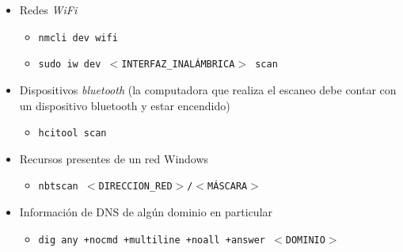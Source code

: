 \begin{itemize}
    \item Redes \emph{WiFi} 
    \begin{itemize}
        \item \texttt{nmcli dev wifi} 
        \item \texttt{sudo iw dev $<$INTERFAZ\_INALÁMBRICA$>$ scan} 
    \end{itemize}
    \item Dispositivos \emph{bluetooth} (la computadora que realiza el escaneo debe contar con un dispositivo bluetooth y estar encendido) 
    \begin{itemize}
        \item \texttt{hcitool scan} 
    \end{itemize}
    \item Recursos presentes de un red Windows
    \begin{itemize}
        \item \texttt{nbtscan $<$DIRECCION\_RED$>$/$<$MÁSCARA$>$} 
    \end{itemize}
    \item Información de DNS de algún dominio en particular
    \begin{itemize}
        \item \texttt{dig any +nocmd +multiline +noall +answer $<$DOMINIO$>$} 
    \end{itemize}
\end{itemize}






\clearpage
\printbibliography


